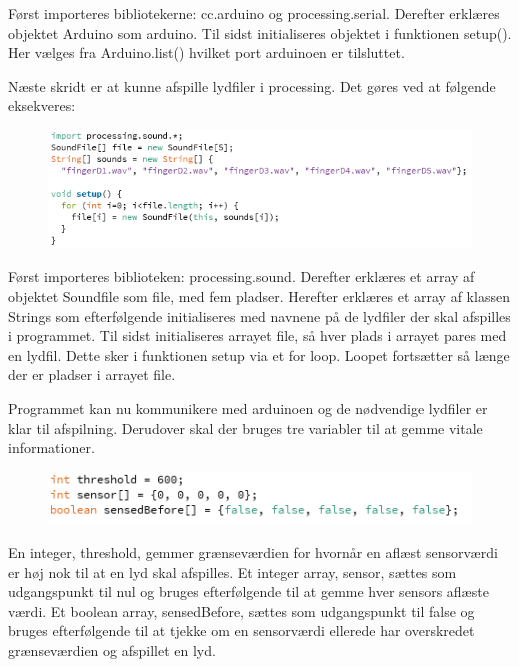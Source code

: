 Først importeres bibliotekerne: cc.arduino og processing.serial.
Derefter erklæres objektet Arduino som arduino. 
Til sidst initialiseres objektet i funktionen setup(). Her vælges fra Arduino.list() hvilket port arduinoen er tilsluttet. 

Næste skridt er at kunne afspille lydfiler i processing. Det gøres ved at følgende eksekveres:

\begin{figure}
\includegraphics[scale=0.8]{Figure/programkode02.png}
\end{figure}  
 
Først importeres biblioteken: processing.sound.
Derefter erklæres et array af objektet Soundfile som file, med fem pladser.
Herefter erklæres et array af klassen Strings som efterfølgende initialiseres med navnene på de lydfiler der skal afspilles i programmet.
Til sidst initialiseres arrayet file, så hver plads i arrayet pares med en lydfil. Dette sker i funktionen setup via et for loop. Loopet fortsætter så længe der er pladser i arrayet file. 

   
Programmet kan nu kommunikere med arduinoen og de nødvendige lydfiler er klar til afspilning. Derudover skal der bruges tre variabler til at gemme vitale informationer. 

\begin{figure}
\includegraphics[scale=0.8]{Figure/programkode03.png}
\end{figure}  

En integer, threshold, gemmer grænseværdien for hvornår en aflæst sensorværdi er høj nok til at en lyd skal afspilles. 
Et integer array, sensor, sættes som udgangspunkt til nul og bruges efterfølgende til at gemme hver sensors aflæste værdi. 
Et boolean array, sensedBefore, sættes som udgangspunkt til false og bruges efterfølgende til at tjekke om en sensorværdi ellerede har overskredet grænseværdien og afspillet en lyd. 
 

